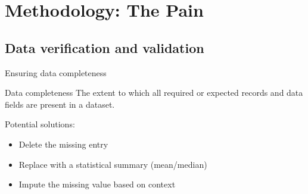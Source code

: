 \documentclass[]{beamer}
\begin{document}



	\section{Methodology: The Pain}



	\subsection{Data verification and validation}

\begin{frame}[fragile]{Ensuring data completeness}
	\begin{block}{Data completeness}
		The extent to which all required or expected records and data fields are present in a dataset.
	\end{block}
	\vspace{1em}
	Potential solutions:
	\begin{itemize}
		\item Delete the missing entry
		\item Replace with a statistical summary (mean/median)
		\item Impute the missing value based on context
	\end{itemize}
\end{frame}
\end{document}
